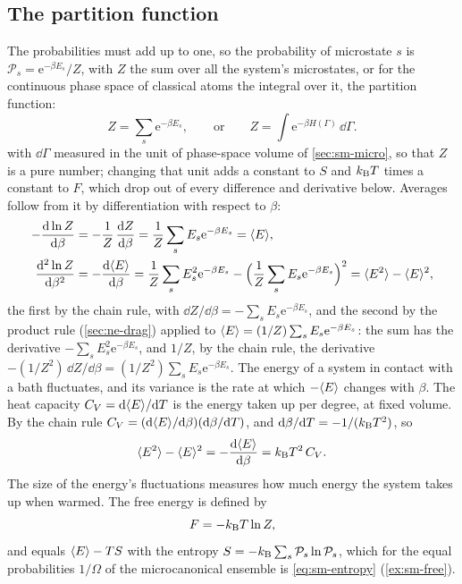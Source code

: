 \subsection*{The partition function}

The probabilities must add up to one, so the probability of microstate
$s$ is $\mathcal{P}_s = \mathrm{e}^{-\beta E_s}/Z$, with $Z$ the sum over
all the system's microstates, or for the continuous phase space of
classical atoms the integral over it, the partition function:
\begin{equation}
   Z = \sum_s\mathrm{e}^{-\beta E_s} , \qquad\text{or}\qquad
   Z = \int\mathrm{e}^{-\beta H(\Gamma)}\,\dd\Gamma .
   \label{eq:sm-partition}
\end{equation}
with $\dd\Gamma$ measured in the unit of phase-space volume of
\cref{sec:sm-micro}, so that $Z$ is a pure number; changing that unit
adds a constant to $S$ and $k_{\mathrm{B}} T$ times a constant to $F$, which drop out
of every difference and derivative below.
Averages follow from it by differentiation with respect to $\beta$:
\begin{align*}
   -\frac{\mathrm{d}\ln Z}{\mathrm{d}\beta} &= -\frac1Z\,\frac{\mathrm{d} Z}{\mathrm{d}\beta}
   = \frac{1}{Z}\sum_sE_s\mathrm{e}^{-\beta E_s} = \langle E \rangle ,\\
   \frac{\mathrm{d}^2\ln Z}{\mathrm{d}\beta^2} &= -\frac{\mathrm{d}\langle E \rangle}{\mathrm{d}\beta}
   = \frac{1}{Z}\sum_sE_s^2\mathrm{e}^{-\beta E_s}
   - \Bigl(\frac1Z\sum_sE_s\mathrm{e}^{-\beta E_s}\Bigr)^2
   = \langle E^2 \rangle - \langle E \rangle^2 ,
\end{align*}
the first by the chain rule, with $\dd Z/\dd\beta = -\sum_sE_s
\mathrm{e}^{-\beta E_s}$, and the second by the product rule
(\cref{sec:ne-drag}) applied to $\langle E \rangle = (1/Z)\sum_sE_s
\mathrm{e}^{-\beta E_s}$: the sum has the derivative $-\sum_sE_s^2
\mathrm{e}^{-\beta E_s}$, and $1/Z$, by the chain rule, the derivative
$-(1/Z^2)\,\dd Z/\dd\beta = (1/Z^2)\sum_sE_s\mathrm{e}^{-\beta E_s}$.
The energy of a system in contact with a bath fluctuates, and its
variance is the rate at which $-\langle E \rangle$ changes with $\beta$. The heat
capacity $C_V = \mathrm{d}\langle E \rangle/\mathrm{d} T$ is the energy taken up per degree, at
fixed volume. By the chain rule $C_V = (\mathrm{d}\langle E \rangle/\mathrm{d}\beta)(\mathrm{d}\beta/\mathrm{d}
T)$, and $\mathrm{d}\beta/\mathrm{d} T = -1/(k_{\mathrm{B}} T^2)$, so
\begin{equation}
   \langle E^2 \rangle - \langle E \rangle^2 = -\frac{\mathrm{d}\langle E \rangle}{\mathrm{d}\beta}
   = k_{\mathrm{B}} T^2\,C_V .
   \label{eq:sm-fluctuation}
\end{equation}
The size of the energy's fluctuations measures how much energy the
system takes up when warmed. The free energy is defined by
\begin{equation*}
   F = -k_{\mathrm{B}} T\ln Z ,
\end{equation*}
and equals $\langle E \rangle - TS$ with the entropy $S = -k_{\mathrm{B}}\sum_s\mathcal{P}_s\ln
\mathcal{P}_s$, which for the equal probabilities $1/\Omega$ of the
microcanonical ensemble is \cref{eq:sm-entropy} (\cref{ex:sm-free}).

